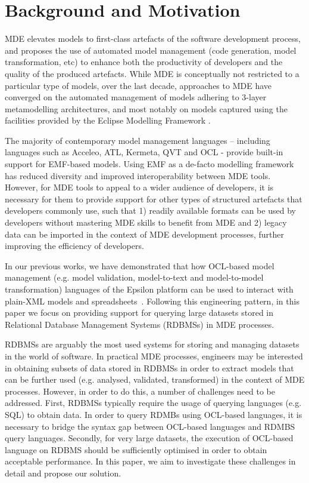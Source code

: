 \section{Background and Motivation}
\label{sec:background}
MDE elevates models to first-class artefacts of the software development process, and proposes the use of automated model management (code generation, model transformation, etc) to enhance both the productivity of developers and the quality of the produced artefacts. 
While MDE is conceptually not restricted to a particular type of models, over the last decade, approaches to MDE have converged on the automated management of models adhering to 3-layer metamodelling architectures, and most notably on models captured using the facilities provided by the Eclipse Modelling Framework \cite{EMF}.

The majority of contemporary model management languages -- including languages such as Acceleo, ATL, Kermeta, QVT and OCL - provide built-in support for EMF-based models. 
Using EMF as a de-facto modelling framework has reduced diversity and improved interoperability between MDE tools.
However, for MDE tools to appeal to a wider audience of developers, it is necessary for them to provide support for other types of structured artefacts that developers commonly use, such that 1) readily available formats can be used by developers without mastering MDE skills to benefit from MDE and 2) legacy data can be imported in the context of MDE development processes, further improving the efficiency of developers.

In our previous works, we have demonstrated that how OCL-based model management (e.g. model validation, model-to-text and model-to-model transformation) languages of the Epsilon platform can be used to interact with plain-XML models \cite{EpsilonXML} and spreadsheets~\cite{EpsilonSpreadsheets}. 
Following this engineering pattern, in this paper we focus on providing support for querying large datasets stored in Relational Database Management Systems (RDBMSs) in MDE processes.

RDBMSs are arguably the most used systems for storing and managing datasets in the world of software.
In practical MDE processes, engineers may be interested in obtaining subsets of data stored in RDBMSs in order to extract models that can be further used (e.g. analysed, validated, transformed) in the context of MDE processes.
However, in order to do this, a number of challenges need to be addressed. 
First, RDBMSs typically require the usage of querying languages (e.g. SQL) to obtain data. 
In order to query RDMBs using OCL-based languages, it is necessary to bridge the syntax gap between OCL-based languages and RDMBS query languages.
Secondly, for very large datasets, the execution of OCL-based language on RDBMS should be sufficiently optimised in order to obtain acceptable performance.
In this paper, we aim to investigate these challenges in detail and propose our solution.

